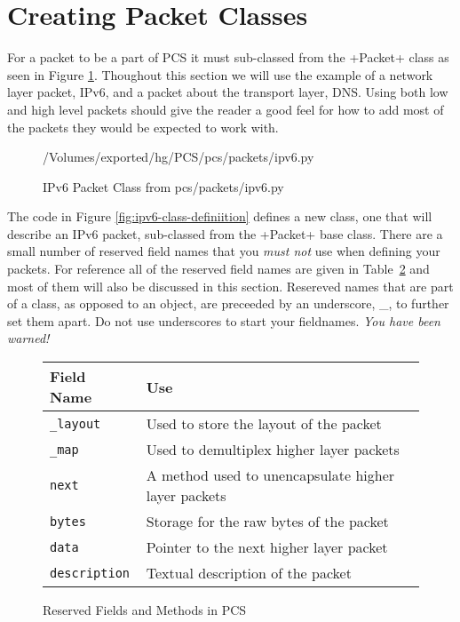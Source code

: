 \documentclass[11pt]{article}
\begin{document}
\section{Creating Packet Classes}

For a packet to be a part of PCS it must sub-classed from the \class+Packet+
class as seen in Figure \ref{fig:ipv6-class-definition}.  Thoughout
this section we will use the example of a network layer packet, IPv6,
and a packet about the transport layer, DNS.  Using both low and high
level packets should give the reader a good feel for how to add most
of the packets they would be expected to work with.

\begin{figure}
  \centering
{/Volumes/exported/hg/PCS/pcs/packets/ipv6.py}
  \caption{IPv6 Packet Class from pcs/packets/ipv6.py}
  \label{fig:ipv6-class-definition}
\end{figure}

The code in Figure \ref{fig:ipv6-class-definiition} defines a new
class, one that will describe an IPv6 packet, sub-classed from the
\class+Packet+ base class.  There are a small number of reserved field
names that you \emph{must not} use when defining your packets.  For
reference all of the reserved field names are given in
Table~\ref{fig:reserved_fields_and_methods} and most of them will also
be discussed in this section.  Resereved names that are part of a
class, as opposed to an object, are preceeded by an underscore, \_, to
further set them apart.  Do not use underscores to start your
fieldnames. \emph{You have been warned!}

\begin{figure}
  \centering
\begin{tabular}{|l|l|}
\hline
Field Name & Use \\
\hline
\texttt{\_layout} & Used to store the layout of the packet\\
\hline
\texttt{\_map} & Used to demultiplex higher layer packets\\
\hline
\texttt{next} & A method used to unencapsulate higher layer packets\\
\hline
\texttt{bytes} & Storage for the raw bytes of the packet\\
\hline
\texttt{data} & Pointer to the next higher layer packet\\
\hline
\texttt{description} & Textual description of the packet\\
\hline
\end{tabular}
  \caption{Reserved Fields and Methods in PCS}
  \label{fig:reserved_fields_and_methods}
\end{figure}
\end{document}

